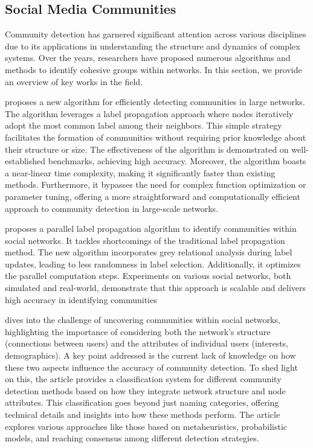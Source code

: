 \documentclass[12pt]{article}
\begin{document}
\subsection{Social Media Communities}

Community detection has garnered significant attention across various disciplines due to its applications
in understanding the structure and dynamics of complex systems.
Over the years, researchers have proposed numerous algorithms and methods to identify cohesive groups within networks.
In this section, we provide an overview of key works in the field.

\cite{Raghavan_2007} proposes a new algorithm for efficiently detecting communities in large networks.
The algorithm leverages a label propagation approach where nodes iteratively adopt the most
common label among their neighbors. This simple strategy facilitates the formation of communities without
requiring prior knowledge about their structure or size. The effectiveness of the algorithm is demonstrated
on well-established benchmarks, achieving high accuracy. Moreover, the algorithm boasts a near-linear time complexity,
making it significantly faster than existing methods. Furthermore, it bypasses the need for complex function
optimization or parameter tuning, offering a more straightforward and
computationally efficient approach to community detection in large-scale networks.

\cite{ZHANG2016133} proposes a parallel label propagation algorithm to identify communities within social networks.
It tackles shortcomings of the traditional label propagation method.
The new algorithm incorporates grey relational analysis during label updates, leading to less randomness in label selection.
Additionally, it optimizes the parallel computation steps. Experiments on various social networks, both simulated and real-world, demonstrate
that this approach is scalable and delivers high accuracy in identifying communities

\cite{Chunaev_2020} dives into the challenge of uncovering communities within social networks, highlighting the importance of considering both
the network's structure (connections between users) and the attributes of individual users (interests, demographics).  A key point
addressed is the current lack of knowledge on how these two aspects influence the accuracy of community detection.
To shed light on this, the article provides a classification system for different community detection methods based on how they
integrate network structure and node attributes. This classification goes beyond just naming categories, offering technical details and
insights into how these methods perform. The article explores various approaches like those based on metaheuristics, probabilistic models,
and reaching consensus among different detection strategies.
\end{document}
